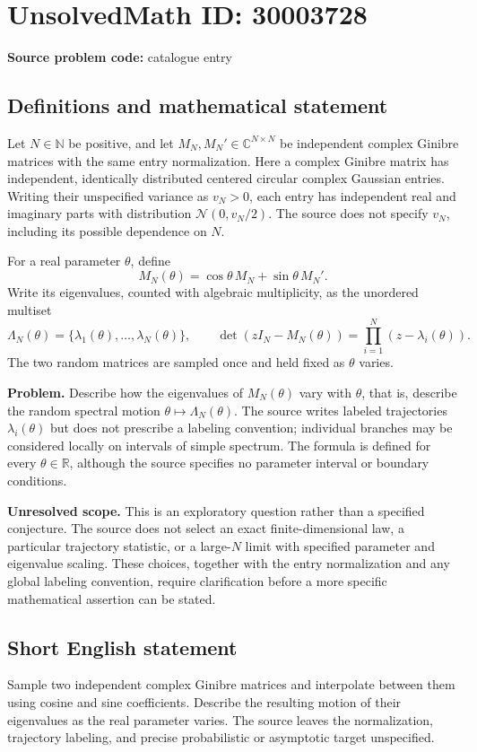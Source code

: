 \documentclass[11pt]{article}
\newcommand{\N}{\mathbb{N}}
\newcommand{\R}{\mathbb{R}}
\newcommand{\C}{\mathbb{C}}
\begin{document}
\section*{UnsolvedMath ID: 30003728}
\textbf{Source problem code:} catalogue entry
\subsection{Definitions and mathematical statement}
Let \(N\in\N\) be positive, and let \(M_N,M_N'\in\C^{N\times N}\) be independent complex Ginibre matrices with the same entry normalization. Here a complex Ginibre matrix has independent, identically distributed centered circular complex Gaussian entries. Writing their unspecified variance as \(v_N>0\), each entry has independent real and imaginary parts with distribution \(\mathcal N(0,v_N/2)\). The source does not specify \(v_N\), including its possible dependence on \(N\).

For a real parameter \(\theta\), define
\[
M_N(\theta)=\cos\theta\,M_N+\sin\theta\,M_N'.
\]
Write its eigenvalues, counted with algebraic multiplicity, as the unordered multiset
\[
\Lambda_N(\theta)=\{\lambda_1(\theta),\ldots,\lambda_N(\theta)\},
\qquad
\det(zI_N-M_N(\theta))=\prod_{i=1}^N(z-\lambda_i(\theta)).
\]
The two random matrices are sampled once and held fixed as \(\theta\) varies.

\textbf{Problem.} Describe how the eigenvalues of \(M_N(\theta)\) vary with \(\theta\), that is, describe the random spectral motion \(\theta\mapsto\Lambda_N(\theta)\). The source writes labeled trajectories \(\lambda_i(\theta)\) but does not prescribe a labeling convention; individual branches may be considered locally on intervals of simple spectrum. The formula is defined for every \(\theta\in\R\), although the source specifies no parameter interval or boundary conditions.

\textbf{Unresolved scope.} This is an exploratory question rather than a specified conjecture. The source does not select an exact finite-dimensional law, a particular trajectory statistic, or a large-\(N\) limit with specified parameter and eigenvalue scaling. These choices, together with the entry normalization and any global labeling convention, require clarification before a more specific mathematical assertion can be stated.
\subsection{Short English statement}
Sample two independent complex Ginibre matrices and interpolate between them using cosine and sine coefficients. Describe the resulting motion of their eigenvalues as the real parameter varies. The source leaves the normalization, trajectory labeling, and precise probabilistic or asymptotic target unspecified.
\end{document}
